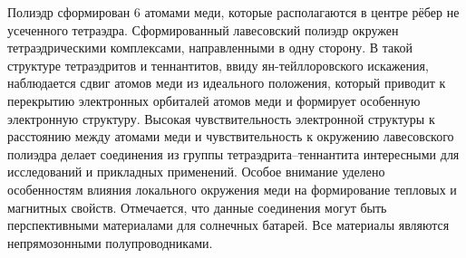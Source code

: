 Полиэдр сформирован 6 атомами меди, которые располагаются  в центре рёбер не усеченного тетраэдра.
Сформированный лавесовский полиэдр окружен тетраэдрическими комплексами, направленными в одну сторону.
В такой структуре тетраэдритов и теннантитов, ввиду ян-тейллоровского искажения,  наблюдается сдвиг атомов меди из идеального положения, который приводит к  перекрытию электронных орбиталей атомов меди и формирует особенную электронную структуру.
Высокая чувствительность электронной структуры к расстоянию между атомами меди и чувствительность к окружению лавесовского полиэдра  делает соединения из группы тетраэдрита--теннантита  интересными для исследований и прикладных применений.
Особое внимание уделено особенностям влияния локального окружения меди на формирование тепловых и магнитных свойств.
Отмечается, что данные соединения могут быть перспективными материалами для солнечных батарей. Все материалы являются непрямозонными полупроводниками.
\newpage
